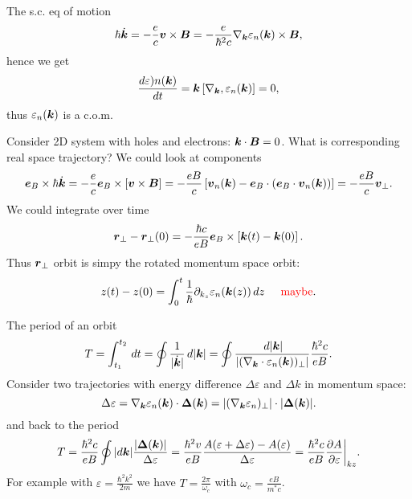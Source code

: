 The s.c. eq of motion 
\begin{equation*}
	\hbar \dot{\boldsymbol{k}} = - \frac{e}{c} \boldsymbol{v} \times \boldsymbol{B} = - \frac{e}{\hbar^2 c} \nabla_{\boldsymbol{k}} \varepsilon_n(\boldsymbol{k}) \times \boldsymbol{B},
\end{equation*}
hence we get
\begin{equation*}
	\frac{d \varepsilon)n (\boldsymbol{k})}{d t}  = \boldsymbol{k} \left[\nabla_{\boldsymbol{k}}, \varepsilon_n(\boldsymbol{k})\right] = 0,
\end{equation*}
thus $\varepsilon_n(\boldsymbol{k})$ is a c.o.m.

Consider 2D system with holes and electrons: $\boldsymbol{k} \cdot \boldsymbol{B} = 0$. What is corresponding real space trajectory? We could look at components
\begin{equation*}
  	\boldsymbol{e}_B \times \hbar \dot{\boldsymbol{k}} = - \frac{e}{c} \boldsymbol{e}_B \times \left[
  		\boldsymbol{v} \times \boldsymbol{B}
  	\right] 
  	= - \frac{e B}{c} \left[
  		\boldsymbol{v}_n (\boldsymbol{k}) - \boldsymbol{e}_B \cdot (\boldsymbol{e}_B \cdot \boldsymbol{v}_n (\boldsymbol{k}))
  	\right]
  	= - \frac{eB}{c} \boldsymbol{v}_\bot.
\end{equation*}  
We could integrate over time
\begin{equation*}
	 \boldsymbol{r}_\bot - \boldsymbol{r}_\bot(0) = - \frac{\hbar c}{e B} \boldsymbol{e}_B \times \left[
	 	\boldsymbol{k}(t) - \boldsymbol{k}(0)
	 \right].
\end{equation*}
Thus $\boldsymbol{r}_\bot$ orbit is simpy the rotated momentum space orbit:
\begin{equation*}
	z(t) - z(0) = \int_{0}^{t} \frac{1}{\hbar} \partial_{k_z} \varepsilon_n (\boldsymbol{k}(z))\, d z
	\hspace{5 mm} 
	\textcolor{red}{\text{maybe}}.
\end{equation*}

The period of an orbit
\begin{equation*}
	T = \int_{t_1}^{t_2} \, d t = \oint \frac{1}{|\dot{\boldsymbol{k}}|} \, d |\boldsymbol{k}| = \oint
	\frac{\, d |\boldsymbol{k}|}{|(\nabla_{\boldsymbol{k}} \cdot \varepsilon_n(\boldsymbol{k}))_\bot|} \frac{\hbar^2 c}{eB}.
\end{equation*}
Consider two trajectories with energy difference $\Delta \varepsilon$ and $\Delta k$ in momentum space:
\begin{equation*}
	\Delta \varepsilon = \nabla_{\boldsymbol{k}} \varepsilon_n (\boldsymbol{k}) \cdot \boldsymbol{\Delta}(\boldsymbol{k}) = | (\nabla_{\boldsymbol{k}} \varepsilon_n)_\bot| \cdot |\boldsymbol{\Delta} (\boldsymbol{k})|.
\end{equation*}
and back to the period
\begin{equation*}
	T = \frac{\hbar^2 c}{eB} \oint |d \boldsymbol{k}| \frac{| \boldsymbol{\Delta}(\boldsymbol{k})|}{\Delta \varepsilon} = \frac{\hbar^2 v}{eB} \frac{A(\varepsilon+\Delta \varepsilon) - A(\varepsilon)}{\Delta \varepsilon} = \frac{\hbar^2 c}{e B} \frac{\partial A}{\partial \varepsilon} \bigg|_{kz}.
\end{equation*}
For example with $\varepsilon = \frac{\hbar^2 k^2}{2m}$ we have $T = \frac{2\pi}{\omega_c}$ with $\omega_c = \frac{e B}{m^* c}$.




